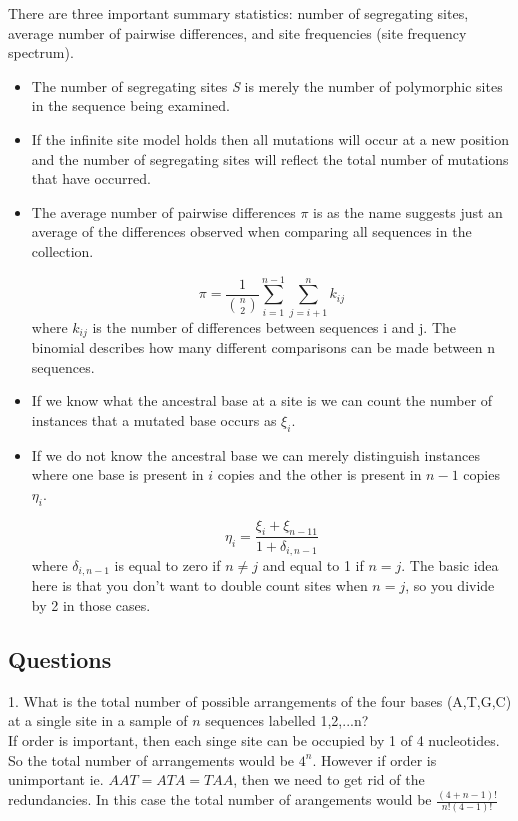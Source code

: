 \documentclass[11pt, oneside]{article}
\begin{document}
There are three important summary statistics: number of segregating sites, average
number of pairwise differences, and site frequencies (site frequency spectrum).
\begin{itemize}
\item{}The number of segregating sites \textit{S} is merely the number of polymorphic 
sites in the sequence being examined.
\item{} If the infinite site model holds then all mutations will occur at a new position and
the number of segregating sites will reflect the total number of mutations that have occurred. 
\item{} The average number of pairwise differences $\pi$ is as the name suggests just an average
of the differences observed when comparing all sequences in the collection. 

\begin{equation}
\pi=\frac{1}{\binom{n}{2}}\sum_{i=1}^{n-1}\sum_{j=i+1}^{n}k_{ij}
\end{equation}
where $k_{ij}$ is the number of differences between sequences i and j. The binomial 
describes how many different comparisons can be made between n sequences. 

\item{} If we know what the ancestral base at a site is we can count the number of instances that 
a mutated base occurs as $\xi_i$.
\item{} If we do not know the ancestral base we can merely distinguish instances where one base is
present in $i$ copies and the other is present in $n-1$ copies $\eta_i$. 

\begin{equation}
\eta_i=\frac{\xi_i+\xi_{n-11}}{1+\delta_{i,n-1}}
\end{equation}
where $ \delta_{i,n-1}$ is equal to zero if $n \neq j$ and equal to 1 if $n = j$. The basic idea here is that
you don't want to double count sites when $n = j$, so you divide by 2 in those cases. 
\end{itemize}

\subsection*{Questions}
1. What is the total number of possible arrangements of the four bases (A,T,G,C) at a
single site in a sample of $n$ sequences labelled 1,2,...n?\\

If order is important, then each singe site can be occupied by 1 of 4 nucleotides. So 
the total number of arrangements would be $4^n$. However if order is unimportant
ie. $AAT=ATA=TAA$, then we need to get rid of the redundancies. In this case the total
number of arangements would be $\frac{(4+n-1)!}{n!(4-1)!}$\\
\end{document}
